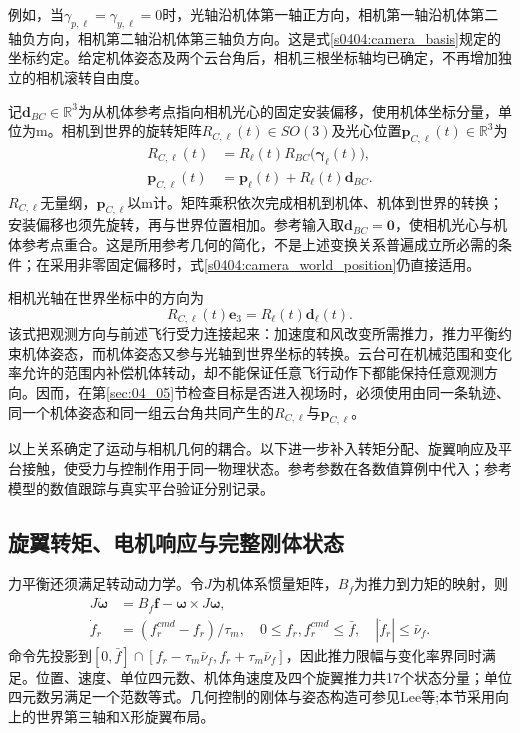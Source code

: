 例如，当$\gamma_{p,\ell}=\gamma_{y,\ell}=0$时，光轴沿机体第一轴正方向，相机第一轴沿机体第二轴负方向，相机第二轴沿机体第三轴负方向。这是式\eqref{s0404:camera_basis}规定的坐标约定。给定机体姿态及两个云台角后，相机三根坐标轴均已确定，不再增加独立的相机滚转自由度。

记$\mathbf d_{BC}\in\mathbb R^3$为从机体参考点指向相机光心的固定安装偏移，使用机体坐标分量，单位为$\mathrm m$。相机到世界的旋转矩阵$R_{C,\ell}(t)\in SO(3)$及光心位置$\mathbf p_{C,\ell}(t)\in\mathbb R^3$为
\begin{subequations}
\label{s0404:camera_world_pose}
\begin{align}
 R_{C,\ell}(t)
 &=R_\ell(t)R_{BC}\bigl(\boldsymbol\gamma_\ell(t)\bigr),
 \label{s0404:camera_world_rotation}\\
 \mathbf p_{C,\ell}(t)
 &=\mathbf p_\ell(t)+R_\ell(t)\mathbf d_{BC}.
 \label{s0404:camera_world_position}
\end{align}
\end{subequations}
$R_{C,\ell}$无量纲，$\mathbf p_{C,\ell}$以$\mathrm m$计。矩阵乘积依次完成相机到机体、机体到世界的转换；安装偏移也须先旋转，再与世界位置相加。参考输入取$\mathbf d_{BC}=\mathbf0$，使相机光心与机体参考点重合。这是所用参考几何的简化，不是上述变换关系普遍成立所必需的条件；在采用非零固定偏移时，式\eqref{s0404:camera_world_position}仍直接适用。

相机光轴在世界坐标中的方向为
\begin{equation}
 R_{C,\ell}(t)\mathbf e_3
 =R_\ell(t)\mathbf d_\ell(t).
 \label{s0404:optical_axis_world}
\end{equation}
该式把观测方向与前述飞行受力连接起来：加速度和风改变所需推力，推力平衡约束机体姿态，而机体姿态又参与光轴到世界坐标的转换。云台可在机械范围和变化率允许的范围内补偿机体转动，却不能保证任意飞行动作下都能保持任意观测方向。因而，在第\ref{sec:04_05}节检查目标是否进入视场时，必须使用由同一条轨迹、同一个机体姿态和同一组云台角共同产生的$R_{C,\ell}$与$\mathbf p_{C,\ell}$。

以上关系确定了运动与相机几何的耦合。以下进一步补入转矩分配、旋翼响应及平台接触，使受力与控制作用于同一物理状态。参考参数在各数值算例中代入；参考模型的数值跟踪与真实平台验证分别记录。

\subsection{旋翼转矩、电机响应与完整刚体状态}

力平衡还须满足转动动力学。令$J$为机体系惯量矩阵，$B_f$为推力到力矩的映射，则
\begin{align}
 J\dot{\boldsymbol\omega}&=B_f\mathbf f-\boldsymbol\omega\times J\boldsymbol\omega,\\
 \dot f_r&=(f_r^{cmd}-f_r)/\tau_m,\quad
 0\le f_r,f_r^{cmd}\le\bar f,\quad |\dot f_r|\le\bar\nu_f.
 \label{s0404:rotor_dynamics}
\end{align}
命令先投影到$[0,\bar f]\cap[f_r-\tau_m\bar\nu_f,f_r+\tau_m\bar\nu_f]$，因此推力限幅与变化率界同时满足。位置、速度、单位四元数、机体角速度及四个旋翼推力共17个状态分量；单位四元数另满足一个范数等式。几何控制的刚体与姿态构造可参见Lee等\cite{LeeSE3};本节采用向上的世界第三轴和X形旋翼布局。

